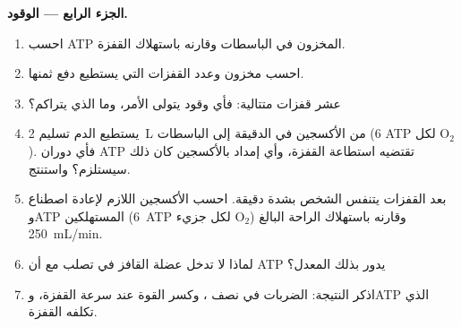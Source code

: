 \begin{problem}
\medskip
\noindent\textbf{الجزء الرابع --- الوقود.}
\begin{enumerate}[resume]
  \item احسب ATP المخزون في الباسطات وقارنه
        باستهلاك القفزة.
  \item احسب مخزون  وعدد القفزات
        التي يستطيع دفع ثمنها.
  \item عشر قفزات متتالية: فأي وقود يتولى الأمر، وما الذي
        يتراكم؟
  \item يستطيع الدم تسليم \qty{2}{L} من الأكسجين في الدقيقة إلى
        الباسطات (6 ATP لكل $\mathrm{O_2}$). فأي دوران ATP تقتضيه
        استطاعة القفزة، وأي إمداد بالأكسجين كان ذلك سيستلزم؟ واستنتج.
  \item بعد القفزات يتنفس الشخص بشدة دقيقة.
        احسب الأكسجين اللازم لإعادة اصطناع 
        وATP المستهلكين (\qty{6}{ATP} لكل جزيء $\mathrm{O_2}$)
        وقارنه باستهلاك الراحة البالغ \qty{250}{mL/min}.
  \item لماذا لا تدخل عضلة القافز في تصلب مع أن ATP
        يدور بذلك المعدل؟
  \item اذكر النتيجة: الضربات في نصف ، وكسر
        القوة عند سرعة القفزة، وATP الذي تكلفه القفزة.
\end{enumerate}
\end{problem}
